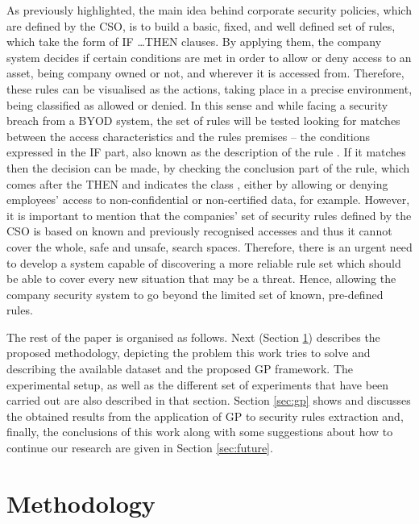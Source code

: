 \documentclass[runningheads]{llncs}
\begin{document}
As previously highlighted, the main idea behind corporate security
policies, which are defined by the CSO, is to build a basic, fixed,
and well defined set of rules, which take the form of \textsc{IF
  \ldots THEN} clauses. By applying them, the company system decides if certain conditions are met in order to allow or
deny access to an asset, being company owned or not, and wherever it is accessed from. 
Therefore, these rules can be visualised as the actions, taking place in a precise environment, being classified as
allowed or denied. In this sense and while facing a security breach
from a BYOD system, the set of rules will be tested looking for
matches between the access characteristics and the rules premises --
the conditions expressed in the IF part, also known as the description
of the rule \cite{DeFalco2002257}. If it matches then the decision can
be made, by checking the conclusion part of the rule, which comes
after the THEN and indicates the class \cite{DeFalco2002257}, either
by allowing or denying employees' access to non-confidential
 or non-certified data, for example. However, it is important to
 mention that the companies'  set of security rules defined by the CSO is
 based on known and previously recognised accesses and thus it cannot
 cover the whole, safe and unsafe, search spaces. Therefore,
 there is an urgent need to develop a system capable of discovering a
 more reliable rule set which should be able to cover every new
 situation that may be a threat. Hence, allowing the company security
 system to go beyond the limited set of known, pre-defined rules. 

The rest of the paper is organised as follows. Next (Section
\ref{sec:methodology}) describes the proposed methodology, depicting
the problem this work tries to solve and describing the available
dataset and the proposed GP framework. The experimental setup, as
well as the different set of experiments that have been carried out
are also described in that section. Section \ref{sec:gp} shows and discusses the
obtained results from the application of GP to security rules
extraction and, finally, the conclusions of this work along with some
suggestions about how to continue our research are given in Section
\ref{sec:future}.

\section{Methodology}
\label{sec:methodology}
\end{document}
